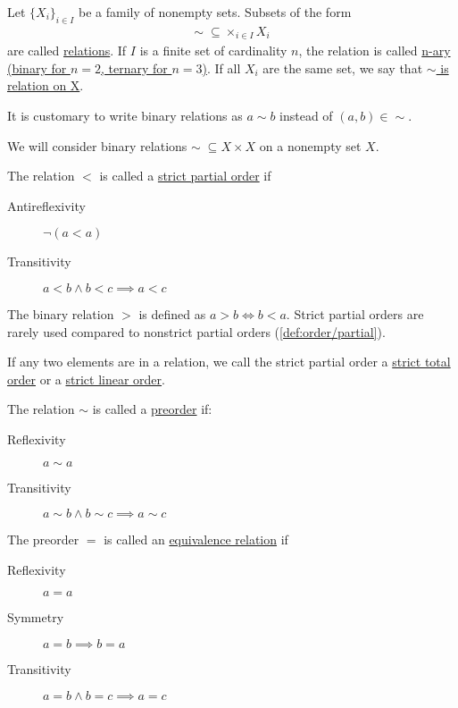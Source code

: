 \begin{definition}\label{def:relations}
  Let $\{ X_i \}_{i \in I}$ be a family of nonempty sets.
  Subsets of the form
  \begin{align*}
    \sim\; \subseteq \times_{i \in I} X_i
  \end{align*}
  are called \uline{relations}. If $I$ is a finite set of cardinality $n$, the relation is called \uline{n-ary (binary for $n = 2$, ternary for $n = 3$)}. If all $X_i$ are the same set, we say that \uline{$\sim$ is relation on X}.

  It is customary to write binary relations as $a \sim b$ instead of $(a, b) \in \sim$.
\end{definition}

\begin{definition}\label{def:orders}
  We will consider binary relations $\sim\; \subseteq X \times X$ on a nonempty set $X$.

  \begin{defenum}
    \item\label{def:order/strict_partial} The relation $<$ is called a \uline{strict partial order} if
    \begin{description}
      \item[Antireflexivity] $\lnot(a < a)$
      \item[Transitivity] $a < b \land b < c \implies a < c$
    \end{description}

    The binary relation $>$ is defined as $a > b \iff b < a$. Strict partial orders are rarely used compared to nonstrict partial orders (\cref{def:order/partial}).

    If any two elements are in a relation, we call the strict partial order a \uline{strict total order} or a \uline{strict linear order}.

    \item\label{def:order/preorder} The relation $\sim$ is called a \uline{preorder} if:
    \begin{description}
      \item[Reflexivity] $a \sim a$
      \item[Transitivity] $a \sim b \land b \sim c \implies a \sim c$
    \end{description}

    \item\label{def:order/equivalence} The preorder $=$ is called an \uline{equivalence relation} if
    \begin{description}
      \item[Reflexivity] $a = a$
      \item[Symmetry] $a = b \implies b = a$
      \item[Transitivity] $a = b \land b = c \implies a = c$
    \end{description}


\end{defenum}
\end{definition}
